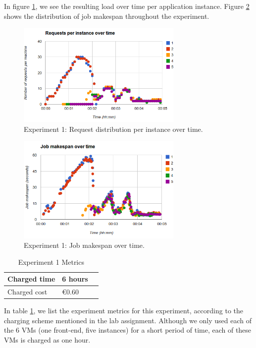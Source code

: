 \documentclass[conference]{IEEEtran}
\begin{document}
In figure \ref{fig-request-distri}, we see the resulting load over time per application instance. Figure \ref{job-makespan} shows the distribution of job makespan throughout the experiment.

\begin{figure}
  \centering
    \includegraphics[width=80mm]{requests-per-instance.png}
  \caption{Experiment 1: Request distribution per instance over time.}
  \label{fig-request-distri}
\end{figure}

\begin{figure}
  \centering
    \includegraphics[width=80mm]{job-makespan.png}
  \caption{Experiment 1: Job makespan over time.}
  \label{job-makespan}
\end{figure}

\begin{table}[H]
  \centering
  \begin{tabular}{| l | l | l |}
    \hline
    Charged time & 6 hours \\ \hline
    Charged cost & \euro 0.60 \\ \hline
  \end{tabular}
  \caption{Experiment 1 Metrics}
  \label{exp1-metrics}
\end{table}

In table \ref{exp1-metrics}, we list the experiment metrics for this experiment, according to the charging scheme mentioned in the lab assignment. Although we only used each of the 6 VMs (one front-end, five instances) for a short period of time, each of these VMs is charged as one hour.
\end{document}

